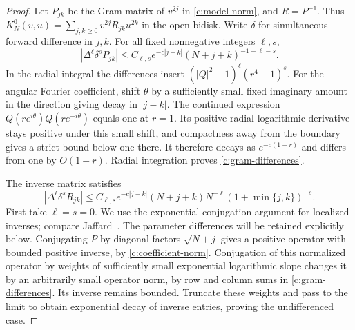 \begin{proof}
Let $P_{jk}$ be the Gram matrix of $v^{2j}$ in
\eqref{c:model-norm}, and $R=P^{-1}$.  Thus
$K_N^0(v,u)=\sum_{j,k\ge0}v^{2j}R_{jk}\overline u^{2k}$ in the
open bidisk.  Write $\delta$ for simultaneous forward difference in
$j,k$.  For all fixed nonnegative integers $\ell,s$,
\begin{equation}\label{c:gram-differences}
 |\Delta^\ell\delta^sP_{jk}|
 \le C_{\ell,s}e^{-c|j-k|}(N+j+k)^{-1-\ell-s}.
\end{equation}
In the radial integral the differences insert
$(|Q|^2-1)^\ell(r^4-1)^s$.  For the angular Fourier coefficient,
shift $\theta$ by a sufficiently small fixed imaginary amount in the
direction giving decay in $|j-k|$.  The continued expression
$Q(re^{i\theta})Q(re^{-i\theta})$ equals one at $r=1$.
Its positive radial logarithmic derivative stays positive under this
small shift, and compactness away from the boundary gives a strict
bound below one there.  It therefore decays as $e^{-c(1-r)}$ and
differs from one by $O(1-r)$.  Radial integration proves
\eqref{c:gram-differences}.

The inverse matrix satisfies
\begin{equation}\label{c:inverse-gram-differences}
 |\Delta^\ell\delta^sR_{jk}|
 \le C_{\ell,s}e^{-c|j-k|}(N+j+k)N^{-\ell}
                   (1+\min\{j,k\})^{-s}.
\end{equation}
First take $\ell=s=0$.  We use the exponential-conjugation argument
for localized inverses; compare Jaffard~\cite[Proposition 2]{Jaffard1990}.
The parameter differences will be retained explicitly below.
Conjugating $P$ by diagonal factors
$\sqrt{N+j}$ gives a positive operator with bounded positive inverse,
by \eqref{c:coefficient-norm}.  Conjugation of this normalized operator
by weights of sufficiently small exponential logarithmic slope changes
it by an arbitrarily small operator norm, by row and column sums in
\eqref{c:gram-differences}.  Its inverse remains bounded.  Truncate
these weights and pass to the limit to obtain exponential decay of
inverse entries, proving the undifferenced case.


\end{proof}

